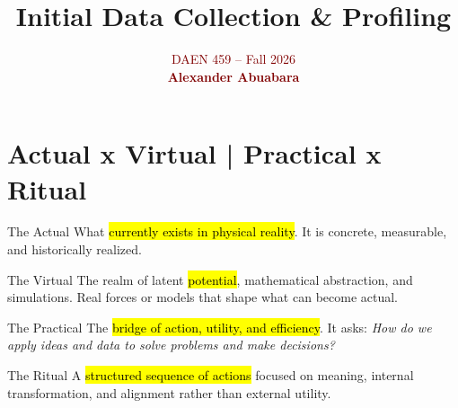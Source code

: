 \documentclass[aspectratio=43,10pt]{beamer}
\title{Initial Data Collection \& Profiling}
\subtitle{}
\author{}
\date{\textcolor{maroon}{DAEN 459 -- Fall 2026\\
      \textbf{Alexander Abuabara}}}
\begin{document}
\begin{frame}
  \titlepage
\end{frame}

\section{Actual x Virtual | Practical x Ritual}

\begin{frame}{}
    \begin{block}{The Actual}
        What \hl{currently exists in physical reality}. It is concrete, measurable, and historically realized.
    \end{block}
    \begin{block}{The Virtual}
        The realm of latent \hl{potential}, mathematical abstraction, and simulations. Real forces or models that shape what can become actual.
    \end{block}
    \begin{block}{The Practical}
        The \hl{bridge of action, utility, and efficiency}. It asks: \textit{How do we apply ideas and data to solve problems and make decisions?}
    \end{block}
    \begin{block}{The Ritual}
        A \hl{structured sequence of actions} focused on meaning, internal transformation, and alignment rather than external utility.
    \end{block}
\end{frame}
\end{document}
